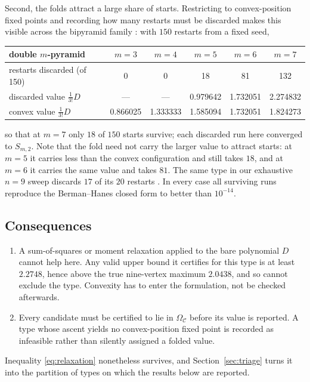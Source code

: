 Second, the folds attract a large share of starts. Restricting to
convex-position fixed points and recording how many restarts must be discarded
makes this visible across the bipyramid family : with $150$
restarts from a fixed seed,
\begin{center}
\begin{tabular}{lccccc}
  \toprule
  double $m$-pyramid & $m=3$ & $m=4$ & $m=5$ & $m=6$ & $m=7$ \\
  \midrule
  restarts discarded (of 150)      & 0 & 0 & 18 & 81 & 132 \\
  discarded value $\tfrac{1}{3!}D$ & --- & --- & 0.979642 & 1.732051 & 2.274832 \\
  convex value $\tfrac{1}{3!}D$    & 0.866025 & 1.333333 & 1.585094 & 1.732051 & 1.824273 \\
  \bottomrule
\end{tabular}
\end{center}
so that at $m = 7$ only $18$ of $150$ starts survive; each discarded run here
converged to $S_{m,2}$. Note that the fold need not carry the larger value to
attract starts: at $m = 5$ it carries less than the convex configuration and
still takes $18$, and at $m = 6$ it carries the same value and takes $81$. The
same type in our exhaustive $n = 9$ sweep discards $17$ of its $20$ restarts
.
In every case all surviving runs reproduce the Berman--Hanes closed form to
better than $10^{-14}$.

\subsection{Consequences}

\begin{enumerate}
  \item A sum-of-squares or moment relaxation applied to the bare polynomial
    $D$ cannot help here. Any valid upper bound it certifies for this type is
    at least $2.2748$, hence above the true nine-vertex maximum $2.0438$, and
    so cannot exclude the type. Convexity has to enter the formulation, not be
    checked afterwards.
  \item Every candidate must be certified to lie in $\Omega_{\mathcal{C}}$
    before its value is reported. A type whose ascent yields no convex-position
    fixed point is recorded as infeasible rather than silently assigned a
    folded value.
\end{enumerate}

Inequality \eqref{eq:relaxation} nonetheless survives, and
Section~\ref{sec:triage} turns it into the partition of types on which the
results below are reported.
